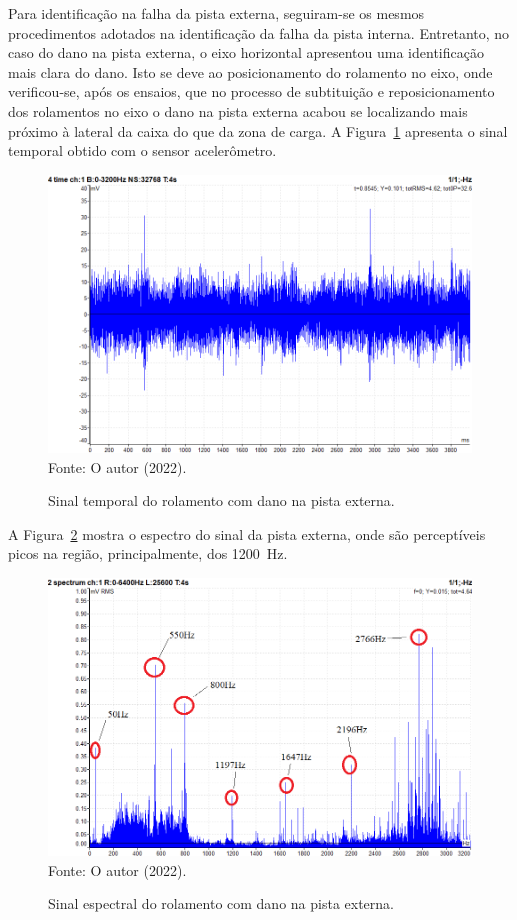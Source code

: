 \documentclass[
	12pt,				
	oneside,			
	a4paper,			
	english,			
	brazil,	
	sumario=abnt-6027-2012		
	]{abntex2ppgsi}
\begin{document}
Para identificação na falha da pista externa, seguiram-se os mesmos procedimentos adotados na identificação da falha da pista interna. Entretanto, no caso do dano na pista externa, o eixo horizontal apresentou uma identificação mais clara do dano. Isto se deve ao posicionamento do rolamento no eixo, onde verificou-se, após os ensaios, que no processo de subtituição e reposicionamento dos rolamentos no eixo o dano na pista externa acabou se localizando mais próximo à lateral da caixa do que da zona de carga. A Figura~\ref{TEMPO_DEFEITO_EXTERNA_100HZ_COM_CARGA} apresenta o sinal temporal obtido com o sensor acelerômetro.

\begin{figure}[H]
\centering
\caption {Sinal temporal do rolamento com dano na pista externa.}
\includegraphics[width=\textwidth,keepaspectratio]{TEMPO_DEFEITO_EXTERNA_100HZ_COM_CARGA} \\
Fonte: O autor (2022).
\label{TEMPO_DEFEITO_EXTERNA_100HZ_COM_CARGA}
\end{figure}

A Figura~\ref{ESPECTRO_DEFEITO_EXTERNA_100HZ} mostra o espectro do sinal da pista externa, onde são perceptíveis picos na região, principalmente, dos \SI{1200}{\hertz}.  

\begin{figure}[H]
\centering
\caption {Sinal espectral do rolamento com dano na pista externa.}
\includegraphics[width=\textwidth,keepaspectratio]{espectro_rolamento_dano_pista_externa_mc4v_mv} \\
Fonte: O autor (2022).
\label{ESPECTRO_DEFEITO_EXTERNA_100HZ}
\end{figure}
  
\end{document}
